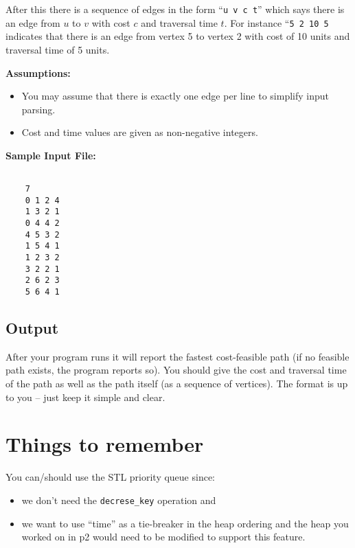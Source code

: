 After this there is a sequence of edges in the form
``\verb+u v c t+'' which says there is an edge from
$u$ to $v$ with cost $c$ and traversal time $t$.
For instance ``\verb+5 2 10 5+ indicates that there
is an edge from vertex 5 to vertex 2 with cost of 10
units and traversal time of 5 units.

{\bf Assumptions:  }

\begin{itemize}
  \item You may assume that there is exactly one edge per line
to simplify input parsing.
  \item Cost and time values are given as non-negative integers.
\end{itemize}

{\bf Sample Input File:}

\begin{verbatim}

    7
    0 1 2 4
    1 3 2 1
    0 4 4 2
    4 5 3 2
    1 5 4 1
    1 2 3 2
    3 2 2 1
    2 6 2 3
    5 6 4 1

\end{verbatim}


\subsection*{Output}
After your program runs it will report the fastest cost-feasible
path (if no feasible path exists, the program reports so).
You should give the cost and traversal time of the path as
well as the path itself (as a sequence of vertices).  The format
is up to you -- just keep it simple and clear.
		
		
\section*{Things to remember}

You can/should use the STL priority queue since:
\begin{itemize}
  \item we don't need the \verb+decrese_key+ operation and
  \item we want to use ``time'' as a tie-breaker in the heap ordering
    and the heap you worked on in p2 would need to be modified to
    support this feature.
\end{itemize}







		





